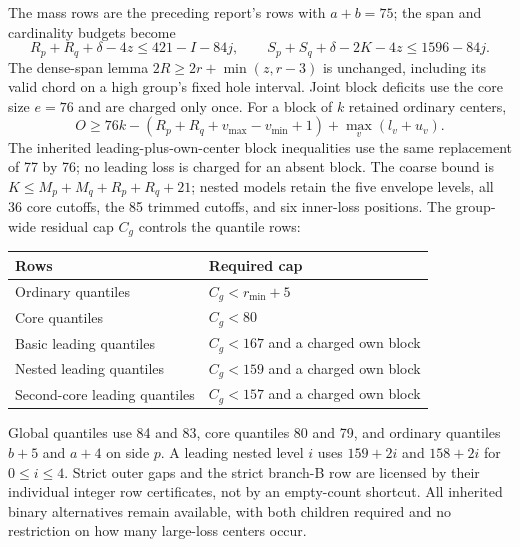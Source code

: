 \documentclass[11pt,a4paper]{article}
\begin{document}
The mass rows are the preceding report's rows with $a+b=75$; the span
and cardinality budgets become
\[
 R_p+R_q+\delta-4z\le421-I-84j,\qquad
 S_p+S_q+\delta-2K-4z\le1596-84j.
\]
The dense-span lemma $2R\ge2r+\min(z,r-3)$ is unchanged, including
its valid chord on a high group's fixed hole interval. Joint block
deficits use the core size $e=76$ and are charged only once.
For a block of $k$ retained ordinary centers,
\[
 O\ge76k-(R_p+R_q+v_{\max}-v_{\min}+1)+\max_v(l_v+u_v).
\]
The inherited leading-plus-own-center block inequalities use the same
replacement of 77 by 76; no leading loss is charged for an absent block.
The coarse bound is $K\le M_p+M_q+R_p+R_q+21$; nested models retain
the five envelope levels, all 36 core cutoffs, the 85 trimmed cutoffs,
and six inner-loss positions.
The group-wide residual cap $C_g$ controls the quantile rows:
\begin{center}
\begin{tabular}{ll}\toprule
Rows&Required cap\\\midrule
Ordinary quantiles&$C_g<r_{\min}+5$\\
Core quantiles&$C_g<80$\\
Basic leading quantiles&$C_g<167$ and a charged own block\\
Nested leading quantiles&$C_g<159$ and a charged own block\\
Second-core leading quantiles&$C_g<157$ and a charged own block\\\bottomrule
\end{tabular}
\end{center}
Global quantiles use 84 and 83, core quantiles 80 and 79, and ordinary
quantiles $b+5$ and $a+4$ on side $p$. A leading nested level $i$
uses $159+2i$ and $158+2i$ for $0\le i\le4$.
Strict outer gaps and the strict branch-B row are licensed by their
individual integer row certificates, not by an empty-count shortcut.
All inherited binary alternatives remain available, with both children
required and no restriction on how many large-loss centers occur.
\end{document}
